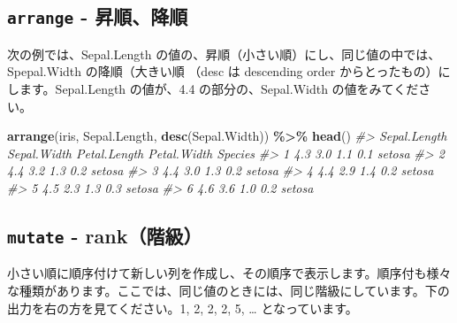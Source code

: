 \documentclass[
  xelatex, ja=standard]{bxjsbook}
\newenvironment{Shaded}{\begin{snugshade}}{\end{snugshade}}
\newcommand{\CommentTok}[1]{\textcolor[rgb]{0.56,0.35,0.01}{\textit{#1}}}
\newcommand{\FunctionTok}[1]{\textcolor[rgb]{0.13,0.29,0.53}{\textbf{#1}}}
\newcommand{\NormalTok}[1]{#1}
\newcommand{\SpecialCharTok}[1]{\textcolor[rgb]{0.81,0.36,0.00}{\textbf{#1}}}
\theoremstyle{definition}
\theoremstyle{definition}
\theoremstyle{definition}
\theoremstyle{definition}
\theoremstyle{remark}
\begin{document}
\hypertarget{arrange---ux6607ux9806ux964dux9806}{%
\subsection{\texorpdfstring{\texttt{arrange} - 昇順、降順}{arrange - 昇順、降順}}\label{arrange---ux6607ux9806ux964dux9806}}

次の例では、Sepal.Length の値の、昇順（小さい順）にし、同じ値の中では、Spepal.Width の降順（大きい順 （desc は descending order からとったもの）にします。Sepal.Length の値が、4.4 の部分の、Sepal.Width の値をみてください。

\begin{Shaded}
\begin{Highlighting}[]
\FunctionTok{arrange}\NormalTok{(iris, Sepal.Length, }\FunctionTok{desc}\NormalTok{(Sepal.Width)) }\SpecialCharTok{\%\textgreater{}\%} \FunctionTok{head}\NormalTok{()}
\CommentTok{\#\textgreater{}   Sepal.Length Sepal.Width Petal.Length Petal.Width Species}
\CommentTok{\#\textgreater{} 1          4.3         3.0          1.1         0.1  setosa}
\CommentTok{\#\textgreater{} 2          4.4         3.2          1.3         0.2  setosa}
\CommentTok{\#\textgreater{} 3          4.4         3.0          1.3         0.2  setosa}
\CommentTok{\#\textgreater{} 4          4.4         2.9          1.4         0.2  setosa}
\CommentTok{\#\textgreater{} 5          4.5         2.3          1.3         0.3  setosa}
\CommentTok{\#\textgreater{} 6          4.6         3.6          1.0         0.2  setosa}
\end{Highlighting}
\end{Shaded}

\hypertarget{mutate---rankux968eux7d1a}{%
\subsection{\texorpdfstring{\texttt{mutate} - rank（階級）}{mutate - rank（階級）}}\label{mutate---rankux968eux7d1a}}

小さい順に順序付けて新しい列を作成し、その順序で表示します。順序付も様々な種類があります。ここでは、同じ値のときには、同じ階級にしています。下の出力を右の方を見てください。1, 2, 2, 2, 5, \ldots{} となっています。
\end{document}
